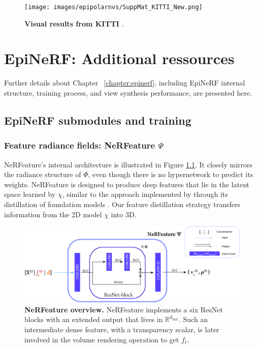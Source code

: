 \begin{figure}[htp!]
    \begin{center}
    \texttt{[image: images/epipolarnvs/SuppMat\_KITTI\_New.png]}
    \end{center}
     \caption{\textbf{Visual results from KITTI} \citep{geiger2012we}.}
     \label{fig:add_visKITTI}
\end{figure}

\chapter{EpiNeRF: Additional ressources}

Further details about Chapter ~\ref{chapter:epinerf}, including EpiNeRF internal structure, training process, and view synthesis performance, are presented here. 

\section{EpiNeRF submodules and training}

\subsection{Feature radiance fields: NeRFeature $\Psi$}

NeRFeature's internal architecture is illustrated in Figure \ref{fig:supp_nerfeature}. It closely mirrors the radiance structure of $\Phi$, even though there is no hypernetwork to predict its weights. NeRFeature is designed to produce deep features that lie in the latent space learned by $\chi$, similar to the approach implemented by \citep{ye2023featurenerf} through its distillation of foundation models \citep{oquab2023dinov2}. Our feature distillation strategy transfers information from the 2D model $\chi$ into 3D.  

\begin{figure}[htp!]
    \begin{center}
  \includegraphics[width=\linewidth]{images/epinerf/supp_nerfeature.png}
  \caption{\textbf{NeRFeature overview.} NeRFeature implements a six ResNet blocks with an extended output that lives in $\mathbb{R}^{d_{\text{feat}}}$. Such an intermediate dense feature, with a transparency scalar, is later involved in the volume rendering operation to get $f_{t}$.}
  \label{fig:supp_nerfeature}
  \end{center}
\end{figure}


